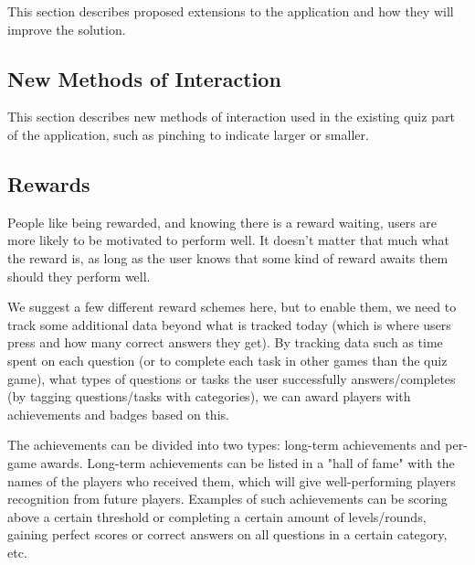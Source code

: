 This section describes proposed extensions to the application and how they will improve the solution.


\subsection{New Methods of Interaction}

This section describes new methods of interaction used in the existing quiz part of the application, such as pinching to indicate larger or smaller.


\subsection{Rewards}

People like being rewarded, and knowing there is a reward waiting, users are more likely to be motivated to perform well. It doesn't matter that much what the reward is, as long as the user knows that some kind of reward awaits them should they perform well.

We suggest a few different reward schemes here, but to enable them, we need to track some additional data beyond what is tracked today (which is where users press and how many correct answers they get). By tracking data such as time spent on each question (or to complete each task in other games than the quiz game), what types of questions or tasks the user successfully answers/completes (by tagging questions/tasks with categories), we can award players with achievements and badges based on this.

The achievements can be divided into two types: long-term achievements and per-game awards. Long-term achievements can be listed in a "hall of fame" with the names of the players who received them, which will give well-performing players recognition from future players. Examples of such achievements can be scoring above a certain threshold or completing a certain amount of levels/rounds, gaining perfect scores or correct answers on all questions in a certain category, etc.


